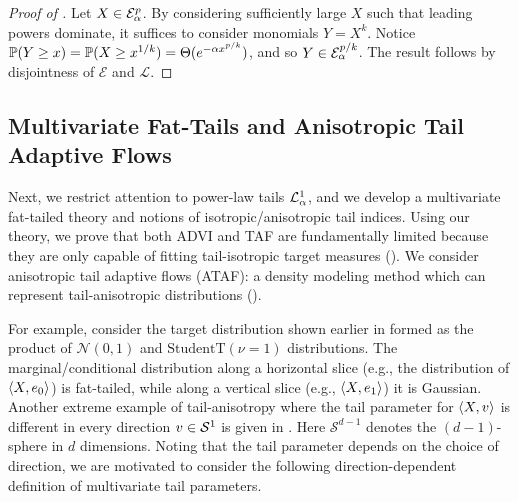 \documentclass[../../thesis.tex]{subfiles}
\begin{document}

\begin{proof}[Proof of ]
  Let $X \in \mathcal{E}^p_\alpha$.
  By considering sufficiently large $X$ such that leading powers dominate, it suffices to consider monomials $Y = X^k$.
  Notice $\mathbb{P}(Y \geq x) = \mathbb{P}(X \geq x^{1/k}) = \Theta(e^{-\alpha x^{p/k}})$, and so
  $Y \in \mathcal{E}^{p/k}_\alpha$. The result follows by disjointness of $\mathcal{E}$ and $\mathcal{L}$.
\end{proof}



\subsection{Multivariate Fat-Tails and Anisotropic Tail Adaptive Flows}

Next, we restrict attention to power-law tails $\mathcal{L}^1_\alpha$, and we develop a multivariate fat-tailed theory and notions of isotropic/anisotropic tail indices. Using our theory, we prove that both ADVI and TAF are fundamentally limited because they
are only capable of fitting tail-isotropic target measures ().
We consider anisotropic tail adaptive flows (ATAF): a density
modeling method which can represent tail-anisotropic distributions ().


For example, consider the target distribution shown earlier in  formed as the product of $\mathcal{N}(0,1)$ and $\text{StudentT}(\nu=1)$ distributions.
The marginal/conditional distribution along a horizontal slice (e.g., the distribution of $\braket{X,e_0}$)
is fat-tailed, while along a vertical slice (e.g., $\braket{X,e_1}$) it is Gaussian.
Another extreme example of tail-anisotropy where the tail parameter for
$\braket{X,v}$ is different in every direction $v \in {\mathcal{S}}^{1}$
is given in . Here $\mathcal{S}^{d-1}$ denotes the $(d-1)$-sphere in $d$ dimensions.
Noting that the tail parameter depends on the choice of direction, we are motivated to consider
the following direction-dependent definition of multivariate tail parameters.
\end{document}
